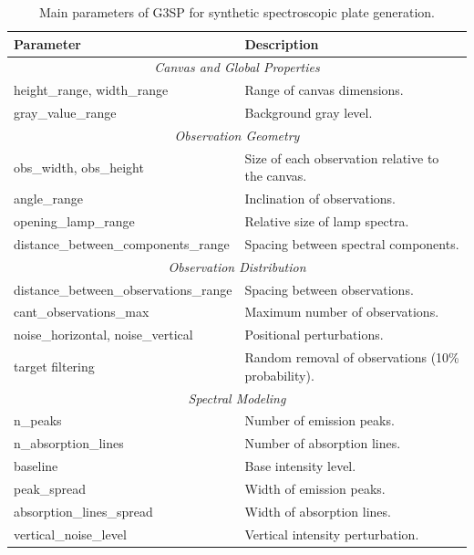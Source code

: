 \begin{table}
    \caption{Main parameters of G3SP for synthetic spectroscopic plate generation.}
    \label{tab:g3sp-parameters}
    \begin{tabularx}{\linewidth}{|l|X|}
        \hline
        \textbf{Parameter} & \textbf{Description} \\
        \hline

        \multicolumn{2}{|c|}{\textit{Canvas and Global Properties}} \\
        \hline
        height\_range, width\_range & Range of canvas dimensions. \\
        gray\_value\_range & Background gray level. \\

        \hline
        \multicolumn{2}{|c|}{\textit{Observation Geometry}} \\
        \hline
        obs\_width, obs\_height & Size of each observation relative to the canvas. \\
        angle\_range & Inclination of observations. \\
        opening\_lamp\_range & Relative size of lamp spectra. \\
        distance\_between\_components\_range & Spacing between spectral components. \\

        \hline
        \multicolumn{2}{|c|}{\textit{Observation Distribution}} \\
        \hline
        distance\_between\_observations\_range & Spacing between observations. \\
        cant\_observations\_max & Maximum number of observations. \\
        noise\_horizontal, noise\_vertical & Positional perturbations. \\
        target filtering & Random removal of observations (10\% probability). \\

        \hline
        \multicolumn{2}{|c|}{\textit{Spectral Modeling}} \\
        \hline
        n\_peaks & Number of emission peaks. \\
        n\_absorption\_lines & Number of absorption lines. \\
        baseline & Base intensity level. \\
        peak\_spread & Width of emission peaks. \\
        absorption\_lines\_spread & Width of absorption lines. \\
        vertical\_noise\_level & Vertical intensity perturbation. \\


\end{tabularx}
\end{table}

